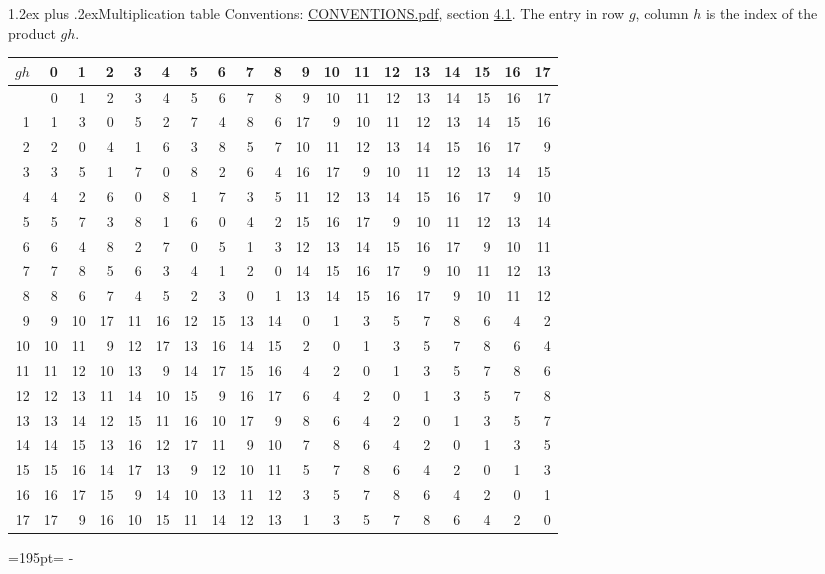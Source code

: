 \documentclass[10pt,a4paper]{article}
\makeatletter
\renewcommand\section{\@startsection{section}{1}{\z@}{-3ex plus -1ex minus -.2ex}%
  {1.2ex plus .2ex}{\normalfont\large\sffamily\bfseries\color{parttitle}}}
\newcommand{\needspace}[1]{\par\penalty-100\begingroup\dimen0=#1\relax\dimen2=\pagegoal
  \advance\dimen2-\pagetotal\ifdim\dimen0>\dimen2\relax\ifdim\dimen2>0pt\vfil\break\fi\fi
  \endgroup}
\numberwithin{equation}{section}
\makeatother
\begin{document}
\section{Multiplication table}\label{s:multiplication}
Conventions: \href{../../CONVENTIONS.pdf}{CONVENTIONS.pdf}, section \href{../../CONVENTIONS.pdf\#conv.4.1}{4.1}.
The entry in row $g$, column $h$ is the index of the product $gh$.
{\normalsize\setlength{\tabcolsep}{0.1em}\setlength{\LTleft}{-8pt plus 1fill}\setlength{\LTright}{-8pt plus 1fill}\begin{longtable}{@{}r|rrrrrrrrrrrrrrrrrr@{}}\toprule
$gh$ & 0 & 1 & 2 & 3 & 4 & 5 & 6 & 7 & 8 & 9 & 10 & 11 & 12 & 13 & 14 & 15 & 16 & 17\\\midrule\endhead
\bottomrule\endfoot\endlastfoot
0 & 0 & 1 & 2 & 3 & 4 & 5 & 6 & 7 & 8 & 9 & 10 & 11 & 12 & 13 & 14 & 15 & 16 & 17\\*
1 & 1 & 3 & 0 & 5 & 2 & 7 & 4 & 8 & 6 & 17 & 9 & 10 & 11 & 12 & 13 & 14 & 15 & 16\\
2 & 2 & 0 & 4 & 1 & 6 & 3 & 8 & 5 & 7 & 10 & 11 & 12 & 13 & 14 & 15 & 16 & 17 & 9\\
3 & 3 & 5 & 1 & 7 & 0 & 8 & 2 & 6 & 4 & 16 & 17 & 9 & 10 & 11 & 12 & 13 & 14 & 15\\
4 & 4 & 2 & 6 & 0 & 8 & 1 & 7 & 3 & 5 & 11 & 12 & 13 & 14 & 15 & 16 & 17 & 9 & 10\\
5 & 5 & 7 & 3 & 8 & 1 & 6 & 0 & 4 & 2 & 15 & 16 & 17 & 9 & 10 & 11 & 12 & 13 & 14\\
6 & 6 & 4 & 8 & 2 & 7 & 0 & 5 & 1 & 3 & 12 & 13 & 14 & 15 & 16 & 17 & 9 & 10 & 11\\
7 & 7 & 8 & 5 & 6 & 3 & 4 & 1 & 2 & 0 & 14 & 15 & 16 & 17 & 9 & 10 & 11 & 12 & 13\\
8 & 8 & 6 & 7 & 4 & 5 & 2 & 3 & 0 & 1 & 13 & 14 & 15 & 16 & 17 & 9 & 10 & 11 & 12\\
9 & 9 & 10 & 17 & 11 & 16 & 12 & 15 & 13 & 14 & 0 & 1 & 3 & 5 & 7 & 8 & 6 & 4 & 2\\
10 & 10 & 11 & 9 & 12 & 17 & 13 & 16 & 14 & 15 & 2 & 0 & 1 & 3 & 5 & 7 & 8 & 6 & 4\\
11 & 11 & 12 & 10 & 13 & 9 & 14 & 17 & 15 & 16 & 4 & 2 & 0 & 1 & 3 & 5 & 7 & 8 & 6\\
12 & 12 & 13 & 11 & 14 & 10 & 15 & 9 & 16 & 17 & 6 & 4 & 2 & 0 & 1 & 3 & 5 & 7 & 8\\
13 & 13 & 14 & 12 & 15 & 11 & 16 & 10 & 17 & 9 & 8 & 6 & 4 & 2 & 0 & 1 & 3 & 5 & 7\\
14 & 14 & 15 & 13 & 16 & 12 & 17 & 11 & 9 & 10 & 7 & 8 & 6 & 4 & 2 & 0 & 1 & 3 & 5\\
15 & 15 & 16 & 14 & 17 & 13 & 9 & 12 & 10 & 11 & 5 & 7 & 8 & 6 & 4 & 2 & 0 & 1 & 3\\
16 & 16 & 17 & 15 & 9 & 14 & 10 & 13 & 11 & 12 & 3 & 5 & 7 & 8 & 6 & 4 & 2 & 0 & 1\\*
17 & 17 & 9 & 16 & 10 & 15 & 11 & 14 & 12 & 13 & 1 & 3 & 5 & 7 & 8 & 6 & 4 & 2 & 0\\
\bottomrule\end{longtable}}
\needspace{195pt}
\end{document}
